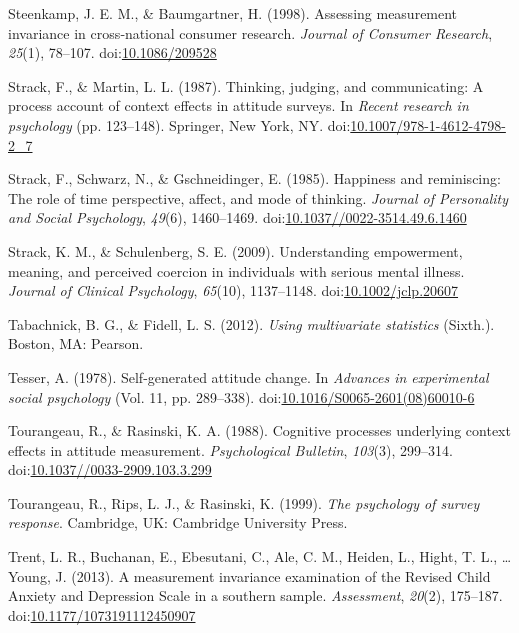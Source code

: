 \documentclass[english,man]{apa6}
\theoremstyle{definition}
\theoremstyle{definition}
\theoremstyle{definition}
\theoremstyle{remark}
\begin{document}
\hypertarget{ref-Steenkamp1998}{}
Steenkamp, J. E. M., \& Baumgartner, H. (1998). Assessing measurement
invariance in cross‐national consumer research. \emph{Journal of
Consumer Research}, \emph{25}(1), 78--107.
doi:\href{https://doi.org/10.1086/209528}{10.1086/209528}

\hypertarget{ref-Strack1987}{}
Strack, F., \& Martin, L. L. (1987). Thinking, judging, and
communicating: A process account of context effects in attitude surveys.
In \emph{Recent research in psychology} (pp. 123--148). Springer, New
York, NY.
doi:\href{https://doi.org/10.1007/978-1-4612-4798-2_7}{10.1007/978-1-4612-4798-2\_7}

\hypertarget{ref-Strack1985}{}
Strack, F., Schwarz, N., \& Gschneidinger, E. (1985). Happiness and
reminiscing: The role of time perspective, affect, and mode of thinking.
\emph{Journal of Personality and Social Psychology}, \emph{49}(6),
1460--1469.
doi:\href{https://doi.org/10.1037//0022-3514.49.6.1460}{10.1037//0022-3514.49.6.1460}

\hypertarget{ref-Strack2009}{}
Strack, K. M., \& Schulenberg, S. E. (2009). Understanding empowerment,
meaning, and perceived coercion in individuals with serious mental
illness. \emph{Journal of Clinical Psychology}, \emph{65}(10),
1137--1148.
doi:\href{https://doi.org/10.1002/jclp.20607}{10.1002/jclp.20607}

\hypertarget{ref-Tabachnick2012}{}
Tabachnick, B. G., \& Fidell, L. S. (2012). \emph{Using multivariate
statistics} (Sixth.). Boston, MA: Pearson.

\hypertarget{ref-Tesser1978}{}
Tesser, A. (1978). Self-generated attitude change. In \emph{Advances in
experimental social psychology} (Vol. 11, pp. 289--338).
doi:\href{https://doi.org/10.1016/S0065-2601(08)60010-6}{10.1016/S0065-2601(08)60010-6}

\hypertarget{ref-Tourangeau1988}{}
Tourangeau, R., \& Rasinski, K. A. (1988). Cognitive processes
underlying context effects in attitude measurement. \emph{Psychological
Bulletin}, \emph{103}(3), 299--314.
doi:\href{https://doi.org/10.1037//0033-2909.103.3.299}{10.1037//0033-2909.103.3.299}

\hypertarget{ref-Tourangeau1999}{}
Tourangeau, R., Rips, L. J., \& Rasinski, K. (1999). \emph{The
psychology of survey response}. Cambridge, UK: Cambridge University
Press.

\hypertarget{ref-Trent2013}{}
Trent, L. R., Buchanan, E., Ebesutani, C., Ale, C. M., Heiden, L.,
Hight, T. L., \ldots{} Young, J. (2013). A measurement invariance
examination of the Revised Child Anxiety and Depression Scale in a
southern sample. \emph{Assessment}, \emph{20}(2), 175--187.
doi:\href{https://doi.org/10.1177/1073191112450907}{10.1177/1073191112450907}
\end{document}
